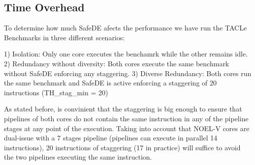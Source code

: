 \subsection{Time Overhead}

To determine how much SafeDE afects the performance we have run the TACLe Benchmarks in three different scenarios:

1) Isolation: Only one core executes the benchamrk while the other remains idle.
2) Redundancy without diversity: Both cores execute the same benchmark without SafeDE enforcing any staggering. 
3) Diverse Redundancy: Both cores run the same benchmark and SafeDE is active enforcing a staggering of 20 instructions (TH\_stag\_min = 20)

As stated before, is convinient that the staggering is big enough to ensure that pipelines of both cores do not contain the same instruction in any of the pipeline stages at any point of the execution. Taking into account that NOEL-V cores are dual-issue with a 7 stages pipeline (pipelines can execute in parallel 14 instructions), 20 instructions of staggering (17 in practice) will suffice to avoid the two pipelines executing the same instruction. 






